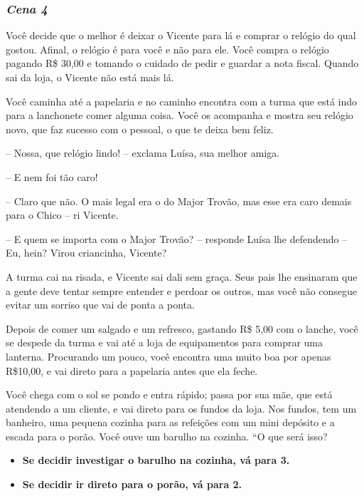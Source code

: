 \bigskip\medskip

\subsubsection{\textit{\textbf{Cena 4}}}
Você decide que o melhor é deixar o Vicente para lá e comprar o relógio do qual gostou. Afinal, o relógio é para você e não para ele. Você compra o relógio pagando R\$ 30,00 e tomando o cuidado de pedir e guardar a nota fiscal. Quando sai da loja, o Vicente não está mais lá.

Você caminha até a papelaria e no caminho encontra com a turma que está indo para a lanchonete comer alguma coisa. Você os acompanha e mostra seu relógio novo, que faz sucesso com o pessoal, o que te deixa bem feliz.

-- Nossa, que relógio lindo! -- exclama Luísa, sua melhor amiga.

-- E nem foi tão caro!

-- Claro que não. O mais legal era o do Major Trovão, mas esse era caro demais para o Chico -- ri Vicente.

-- E quem se importa com o Major Trovão? -- responde Luísa lhe defendendo --
Eu, hein? Virou criancinha, Vicente?

A turma cai na risada, e Vicente sai dali sem graça. Seus pais lhe ensinaram que a gente deve tentar sempre entender e perdoar os outros, mas você não consegue evitar um sorriso que vai de ponta a ponta.

Depois de comer um salgado e um refresco, gastando R\$ 5,00 com o lanche, você se despede da turma e vai até a loja de equipamentos para comprar uma lanterna. Procurando um pouco, você encontra uma muito boa por apenas R\$10,00, e vai direto para a papelaria antes que ela feche.

Você chega com o sol se pondo e entra rápido; passa por sua mãe, que está atendendo a um cliente, e vai direto para os fundos da loja. Nos fundos, tem um banheiro, uma pequena cozinha para as refeições com um mini depósito e a escada para o porão. Você ouve um barulho na cozinha. “O que será isso?

\begin{itemize}
	\item \textbf{Se decidir investigar o barulho na cozinha, vá para 3.}
	\item \textbf{Se decidir ir direto para o porão, vá para 2.}
\end{itemize}

